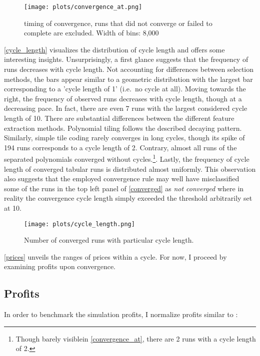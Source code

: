\begin{figure}
	\texttt{[image: plots/convergence\_at.png]}
	\caption{timing of convergence, runs that did not converge or failed to complete are excluded. Width of bins: 8,000}
	\label{convergence_at}
\end{figure}

\autoref{cycle_length} visualizes the distribution of cycle length and offers some interesting insights. Unsurprisingly, a first glance suggests that the frequency of runs decreases with cycle length. Not accounting for differences between selection methods, the bars appear similar to a geometric distribution with the largest bar corresponding to a 'cycle length of 1' (i.e.\ no cycle at all). Moving towards the right, the frequency of observed runs decreases with cycle length, though at a decreasing pace. In fact, there are even 7 runs with the largest considered cycle length of 10. There are substantial differences between the different feature extraction methods. Polynomial tiling follows the described decaying pattern. Similarly, simple tile coding rarely converges in long cycles, though its spike of 194 runs corresponds to a cycle length of 2. Contrary, almost all runs of the separated polynomials converged without cycles.\footnote{Though barely visiblein \autoref{convergence_at}, there are 2 runs with a cycle length of 2.}. Lastly, the frequency of cycle length of converged tabular runs is distributed almost uniformly. This observation also suggests that the employed convergence rule may well have misclassified some of the runs in the top left panel of \autoref{converged} as \emph{not converged} where in reality the convergence cycle length simply exceeded the threshold arbitrarily set at 10. 

\begin{figure}
	\texttt{[image: plots/cycle\_length.png]}
	\caption{Number of converged runs with particular cycle length.}
	\label{cycle_length}
\end{figure}

\autoref{prices} unveils the ranges of prices within a cycle. For now, I proceed by examining profits upon convergence.

\subsection{Profits}

In order to benchmark the simulation profits, I normalize profits similar to \textcite{calvano_algorithmic_2018}:

